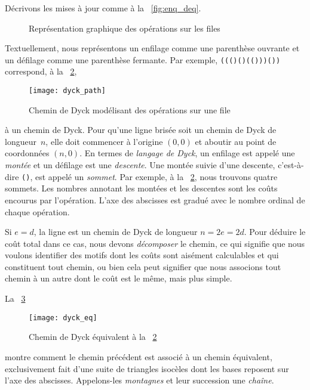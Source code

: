 Décrivons les mises à jour comme à la \fig~\vref{fig:enq_deq}.
\begin{figure}
\centering
{}
\qquad
{}
\caption{Représentation graphique des opérations sur les files}
\label{fig:enq_deq}
\end{figure}
Textuellement, nous représentons un enfilage comme une parenthèse
ouvrante et un défilage comme une parenthèse fermante. Par exemple,
\texttt{((()()(()))())} correspond, à la \fig~\ref{fig:dyck_path},
\begin{figure}
\centering
\texttt{[image: dyck\_path]}
\caption{Chemin de Dyck modélisant des opérations sur une file}
\label{fig:dyck_path}
\end{figure}
à un chemin de Dyck. Pour qu'une ligne brisée
soit un chemin de Dyck de longueur~\(n\), elle doit commencer à
l'origine \((0,0)\) et aboutir au point de coordonnées \((n,0)\). En
termes de \emph{langage de Dyck}, un enfilage est appelé une
\emph{montée} et un défilage est une
\emph{descente}. Une montée suivie
d'une descente, c'est-à-dire \texttt{()}, est appelé un
\emph{sommet}. Par exemple, à la
\fig~\ref{fig:dyck_path}, nous trouvons quatre sommets. Les nombres
annotant les montées et les descentes sont les coûts encourus par
l'opération. L'axe des abscisses est gradué avec le nombre ordinal de
chaque opération.

Si \(e=d\), la ligne est un chemin de Dyck de longueur
\(n=2e=2d\). Pour déduire le coût total dans ce cas, nous devons
\emph{décomposer} le chemin, ce
qui signifie que nous voulons identifier des motifs dont les coûts
sont aisément calculables et qui constituent tout chemin, ou bien cela
peut signifier que nous associons tout chemin à un autre dont le coût
est le même, mais plus simple.

La \fig~\ref{fig:dyck_eq}
\begin{figure}[b]
\centering
\texttt{[image: dyck\_eq]}
\caption{Chemin de Dyck équivalent à la \fig~\ref{fig:dyck_path}}
\label{fig:dyck_eq}
\end{figure}
montre comment le chemin précédent est associé à un chemin équivalent,
exclusivement fait d'une suite de triangles isocèles dont les bases
reposent sur l'axe des abscisses. Appelons-les
\emph{montagnes} et leur succession une
\emph{chaîne}.

